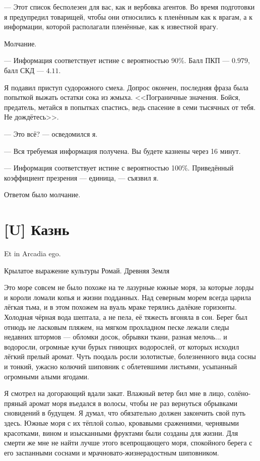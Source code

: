 --- Этот список бесполезен для вас, как и вербовка агентов.
Во время подготовки я предупредил товарищей, чтобы они относились к пленённым как к врагам, а к информации, которой располагали пленённые, как к известной врагу.

Молчание.

--- Информация соответствует истине с вероятностью 90\%.
Балл ПКП --- $0.979$, балл СКД --- $4.11$.

Я подавил приступ судорожного смеха.
Допрос окончен, последняя фраза была попыткой выжать остатки сока из жмыха.
<<Пограничные значения.
Бойся, предатель, метайся в попытках спастись, ведь спасение в семи тысячных от тебя.
Не дождётесь>>.

--- Это всё? --- осведомился я.

--- Вся требуемая информация получена.
Вы будете казнены через 16 минут.

--- Информация соответствует истине с вероятностью 100\%.
Приведённый коэффициент презрения --- единица, --- съязвил я.

Ответом было молчание.

\section{[U] Казнь}

\epigraph
{Et in Arcadia ego\FM.}
{Крылатое выражение культуры Ромай.
Древняя Земля}

\textspace

Это море совсем не было похоже на те лазурные южные моря, за которые лорды и короли ломали копья и жизни подданных.
Над северным морем всегда царила лёгкая тьма, и в этом похожем на вуаль мраке терялись далёкие горизонты.
Холодная чёрная вода шептала, а не пела, её тяжесть вгоняла в сон.
Берег был отнюдь не ласковым пляжем, на мягком прохладном песке лежали следы недавних штормов --- обломки досок, обрывки ткани, разная мелочь... и водоросли, огромные кучи бурых гниющих водорослей, от которых исходил лёгкий прелый аромат.
Чуть поодаль росли золотистые, болезненного вида сосны и тонкий, ужасно колючий шиповник с облетевшими листьями, усыпанный огромными алыми ягодами.

Я смотрел на догорающий вдали закат.
Влажный ветер бил мне в лицо, солёно-пряный аромат моря въедался в волосы, чтобы не раз вернуться обрывками сновидений в будущем.
Я думал, что обязательно должен закончить свой путь здесь.
Южные моря с их тёплой солью, кровавыми сражениями, чернявыми красотками, вином и изысканными фруктами были созданы для жизни.
Для смерти же мне не найти лучше этого всепрощающего моря, спокойного берега с его заспанными соснами и мрачновато-жизнерадостным шиповником.

